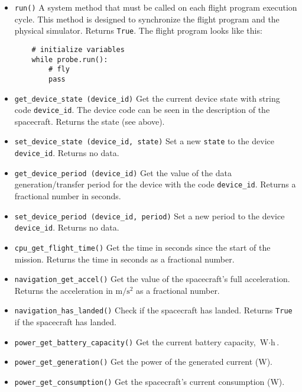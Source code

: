 \documentclass[12pt,a4paper]{article}
\begin{document}
\begin{itemize}
\item \verb'run()' A system method that must be called on each flight program execution cycle. This method is designed to synchronize the flight program and the physical simulator. Returns \verb'True'. The flight program looks like this:
\begin{verbatim}
    # initialize variables
    while probe.run():
        # fly
        pass
\end{verbatim}

\item \verb'get_device_state (device_id)' Get the current device state with string code \verb'device_id'. The device code can be seen in the description of the spacecraft. Returns the state (see above).

\item \verb'set_device_state (device_id, state)' Set a new \verb'state' to the device \verb'device_id'. Returns no data.

\item \verb'get_device_period (device_id)' Get the value of the data generation/transfer period for the device with the code \verb'device_id'. Returns a fractional number in seconds.

\item \verb'set_device_period (device_id, period)' Set a new period to the device \verb'device_id'. Returns no data.

\item \verb'cpu_get_flight_time()' Get the time in seconds since the start of the mission. Returns the time in seconds as a fractional number.

\item \verb'navigation_get_accel()' Get the value of the spacecraft's full acceleration. Returns the acceleration in $\text{m}/\text{s}^2$ as a fractional number.

\item \verb'navigation_has_landed()' Check if the spacecraft has landed. Returns \verb'True' if the spacecraft has landed.

\item \verb'power_get_battery_capacity()' Get the current battery capacity, $\text{W} \cdot \text{h}$.

\item \verb'power_get_generation()' Get the power of the generated current (W).

\item \verb'power_get_consumption()' Get the spacecraft's current consumption (W).


\end{itemize}
\end{document}
